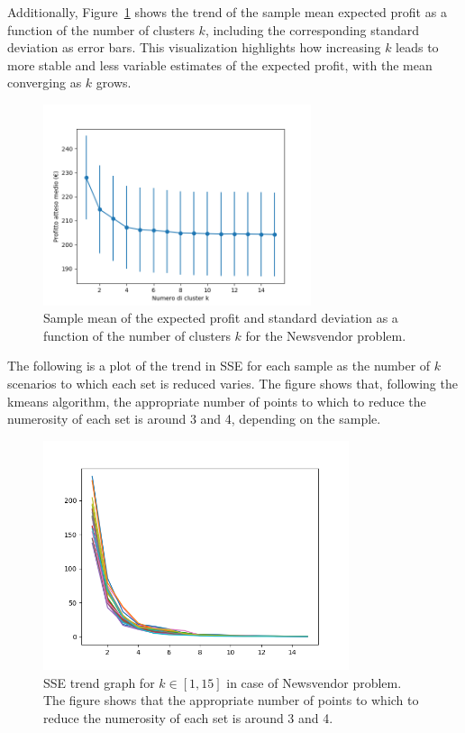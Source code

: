\documentclass[a4paper,12pt]{article}
\begin{document}
	\noindent
	Additionally, Figure~\ref{fig:rendimentoK-nv} shows the trend of the sample mean expected profit as a function of the number of clusters $k$, including the corresponding standard deviation as error bars. This visualization highlights how increasing $k$ leads to more stable and less variable estimates of the expected profit, with the mean converging as $k$ grows.
	
	\begin{figure}[H]
		\centering
		\includegraphics[width=0.7\textwidth]{../immagini/rendimentoK_nv.png}
		\caption{Sample mean of the expected profit and standard deviation as a function of the number of clusters $k$ for the Newsvendor problem.}
		\label{fig:rendimentoK-nv}
	\end{figure}
	
	
	\noindent The following is a plot of the trend in SSE for each sample as the number of $k$ scenarios to which each set is reduced varies. The figure shows that, following the kmeans algorithm, the appropriate number of points to which to reduce the numerosity of each set is around 3 and 4, depending on the sample.
	
	\begin{figure}[H]
		\centering
		\includegraphics[width=0.8\textwidth]{../immagini/sseNV.png}
		\caption{SSE trend graph for $k \in [1,15]$ in case of Newsvendor problem. The figure shows that the appropriate number of points to which to reduce the numerosity of each set is around 3 and 4.}
		\label{fig:sse-nv}
	\end{figure}
	
\end{document}
